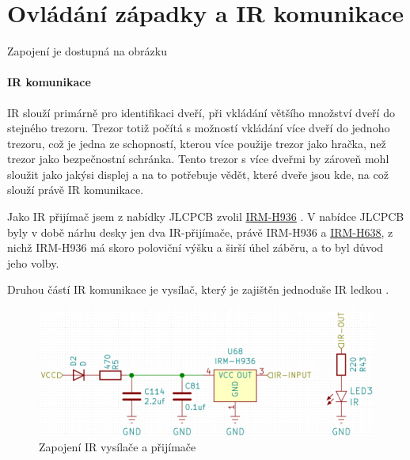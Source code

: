 \section{Ovládání západky a IR komunikace}

Zapojení je dostupná na obrázku 

\paragraph{IR komunikace}
IR slouží primárně pro identifikaci dveří, při vkládání většího množství dveří do stejného trezoru.
Trezor totiž počítá s možností vkládání více dveří do jednoho trezoru, což je jedna ze schopností, kterou více použije trezor jako hračka, než trezor jako bezpečnostní schránka.
Tento trezor s více dveřmi by zároveň mohl sloužit jako jakýsi displej a na to potřebuje vědět, které dveře jsou kde, na což slouží právě IR komunikace. %

Jako IR přijímač jsem z nabídky JLCPCB \parencite{jlcpcb} zvolil \href{https://datasheet.lcsc.com/szlcsc/1912111437_Everlight-Elec-IRM-H936-TR2_C264266.pdf}{IRM-H936} \parencite{irm-h936}. 
V nabídce JLCPCB byly v době nárhu desky jen dva IR-přijímače, právě IRM-H936 a \href{https://datasheet.lcsc.com/szlcsc/2010221806_Everlight-Elec-IRM-H638T-TR2-DX_C390031.pdf}{IRM-H638},
z nichž IRM-H936 má skoro poloviční výšku a širší úhel záběru, a to byl důvod jeho volby.

Druhou částí IR komunikace je vysílač, který je zajištěn jednoduše IR ledkou \parencite{ir19-21c/tr8}.

\begin{figure}[htbp]
    \centering
    \includegraphics[width=\textwidth]{kapitoly/obrazky/E4/ir_motor_enkoder/IR.png}
    \caption{Zapojení IR vysílače a přijímače}
    \label{fig:E4-ir}
\end{figure}

\newpage

